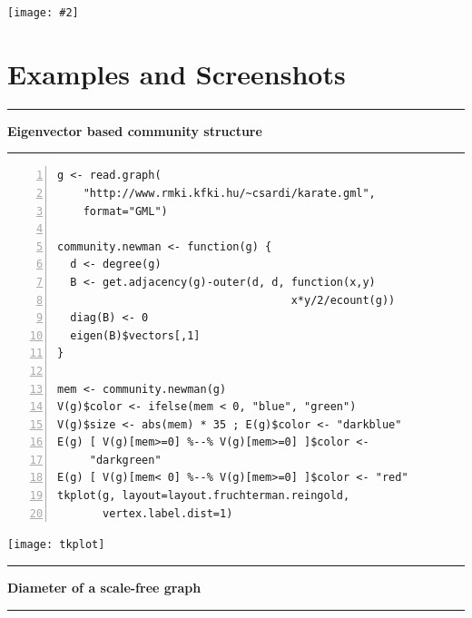 \documentclass[a0]{sciposter}
\newcommand{\figfigure}[2]{%
  \texttt{[image: \#2]}
}
\begin{document}
\begin{multicols}{3}
\begin{center}
\figfigure{\columnwidth}{arch}
\end{center}

\section{Examples and Screenshots}




\vspace{20pt}\hrule\vspace{20pt}
\centerline{\bf Eigenvector based community structure}
\vspace{20pt}\hrule\vspace{20pt}

\begin{Verbatim}[fontsize=\small,numbers=left]
g <- read.graph(
    "http://www.rmki.kfki.hu/~csardi/karate.gml", 
    format="GML")

community.newman <- function(g) {
  d <- degree(g)
  B <- get.adjacency(g)-outer(d, d, function(x,y) 
                                    x*y/2/ecount(g))
  diag(B) <- 0
  eigen(B)$vectors[,1]
}

mem <- community.newman(g)
V(g)$color <- ifelse(mem < 0, "blue", "green")
V(g)$size <- abs(mem) * 35 ; E(g)$color <- "darkblue"
E(g) [ V(g)[mem>=0] %--% V(g)[mem>=0] ]$color <- 
     "darkgreen"
E(g) [ V(g)[mem< 0] %--% V(g)[mem>=0] ]$color <- "red"
tkplot(g, layout=layout.fruchterman.reingold,
       vertex.label.dist=1)
\end{Verbatim}

\begin{center}
\texttt{[image: tkplot]}
\end{center}

\vspace{20pt}\hrule\vspace{20pt}
\centerline{\bf Diameter of a scale-free graph}
\vspace{20pt}\hrule\vspace{20pt}


\end{multicols}
\end{document}

